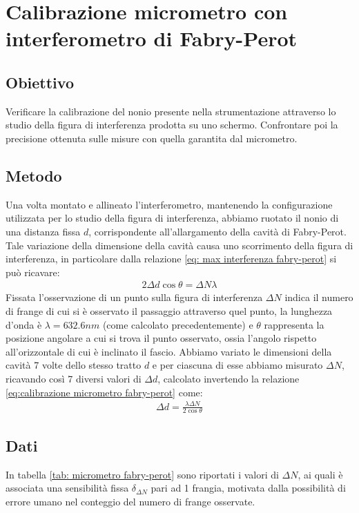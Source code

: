 \documentclass[a4paper]{article}
\begin{document}
\section{Calibrazione micrometro con interferometro di Fabry-Perot}
\subsection{Obiettivo}
Verificare la calibrazione del nonio presente nella strumentazione attraverso lo studio della figura di interferenza prodotta su uno schermo.
Confrontare poi la precisione ottenuta sulle misure con quella garantita dal micrometro.
\subsection{Metodo}
Una volta montato e allineato l'interferometro, mantenendo la configurazione utilizzata per lo studio della figura di interferenza, abbiamo ruotato il 
nonio di una distanza fissa $d$, corrispondente all'allargamento della cavità di Fabry-Perot. Tale variazione della dimensione della cavità causa uno
scorrimento della figura di interferenza, in particolare dalla relazione \ref{eq: max interferenza fabry-perot} si può ricavare:
\begin{align}
    2 \Delta d \cos  \theta = \Delta N \lambda
\label{eq:calibrazione micrometro fabry-perot}
\end{align}
Fissata l'osservazione di un punto sulla figura di interferenza $\Delta N$ indica il numero di frange di cui si è osservato il passaggio attraverso quel punto, la lunghezza d'onda è $\lambda = 632.6 nm$ (come calcolato precedentemente) e $\theta$ rappresenta la posizione angolare a cui si trova il punto osservato, ossia l'angolo rispetto all'orizzontale di cui è inclinato il fascio.
Abbiamo variato le dimensioni della cavità 7 volte dello stesso tratto $d$ e per ciascuna di esse abbiamo misurato $\Delta N$, ricavando così 7 diversi valori di $\Delta d$, calcolato invertendo la relazione \ref{eq:calibrazione micrometro fabry-perot} come:
\begin{align}
    \Delta d = \frac{\lambda \Delta N}{2\cos{\theta}}
\label{eq:calibrazione micrometro fabry-perot invertita}
\end{align}

\subsection{Dati}
In tabella \ref{tab: micrometro fabry-perot} sono riportati i valori di $\Delta N$, ai quali è associata una sensibilità fissa $\delta_{\Delta N}$ pari ad 1 frangia, motivata dalla possibilità di errore umano nel conteggio del numero di frange osservate.
\end{document}
